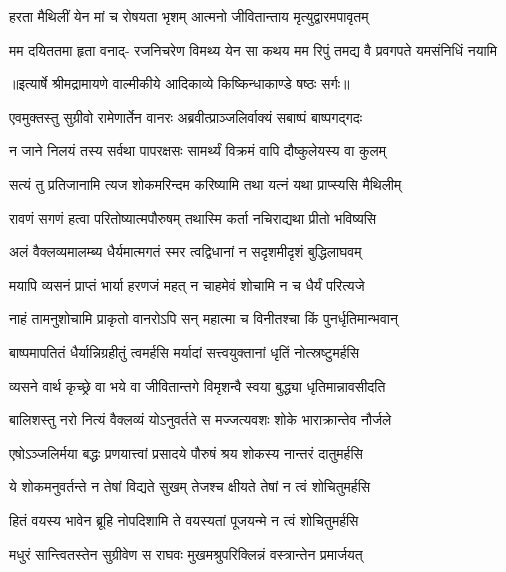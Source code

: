 \twolineshloka
{हरता मैथिलीं येन मां च रोषयता भृशम्}
{आत्मनो जीवितान्ताय मृत्युद्वारमपावृतम्} %

\fourlineindentedshloka
{मम दयिततमा हृता वनाद्-}
{रजनिचरेण विमथ्य येन सा}
{कथय मम रिपुं तमद्य वै}
{प्रवगपते यमसंनिधिं नयामि} %


{॥इत्यार्षे श्रीमद्रामायणे वाल्मीकीये आदिकाव्ये किष्किन्धाकाण्डे षष्ठः सर्गः॥}


\twolineshloka
{एवमुक्तस्तु सुग्रीवो रामेणार्तेन वानरः}
{अब्रवीत्प्राञ्जलिर्वाक्यं सबाष्पं बाष्पगद्गदः} %

\twolineshloka
{न जाने निलयं तस्य सर्वथा पापरक्षसः}
{सामर्थ्यं विक्रमं वापि दौष्कुलेयस्य वा कुलम्} %

\twolineshloka
{सत्यं तु प्रतिजानामि त्यज शोकमरिन्दम}
{करिष्यामि तथा यत्नं यथा प्राप्स्यसि मैथिलीम्} %

\twolineshloka
{रावणं सगणं हत्वा परितोष्यात्मपौरुषम्}
{तथास्मि कर्ता नचिराद्यथा प्रीतो भविष्यसि} %

\twolineshloka
{अलं वैक्लव्यमालम्ब्य धैर्यमात्मगतं स्मर}
{त्वद्विधानां न सदृशमीदृशं बुद्धिलाघवम्} %

\twolineshloka
{मयापि व्यसनं प्राप्तं भार्या हरणजं महत्}
{न चाहमेवं शोचामि न च धैर्यं परित्यजे} %

\twolineshloka
{नाहं तामनुशोचामि प्राकृतो वानरोऽपि सन्}
{महात्मा च विनीतश्चा किं पुनर्धृतिमान्भवान्} %

\twolineshloka
{बाष्पमापतितं धैर्यान्निग्रहीतुं त्वमर्हसि}
{मर्यादां सत्त्वयुक्तानां धृतिं नोत्स्रष्टुमर्हसि} %

\twolineshloka
{व्यसने वार्थ कृच्छ्रे वा भये वा जीवितान्तगे}
{विमृशन्वै स्वया बुद्ध्या धृतिमान्नावसीदति} %

\twolineshloka
{बालिशस्तु नरो नित्यं वैक्लव्यं योऽनुवर्तते}
{स मज्जत्यवशः शोके भाराक्रान्तेव नौर्जले} %

\twolineshloka
{एषोऽञ्जलिर्मया बद्धः प्रणयात्त्वां प्रसादये}
{पौरुषं श्रय शोकस्य नान्तरं दातुमर्हसि} %

\twolineshloka
{ये शोकमनुवर्तन्ते न तेषां विद्यते सुखम्}
{तेजश्च क्षीयते तेषां न त्वं शोचितुमर्हसि} %

\twolineshloka
{हितं वयस्य भावेन ब्रूहि नोपदिशामि ते}
{वयस्यतां पूजयन्मे न त्वं शोचितुमर्हसि} %

\twolineshloka
{मधुरं सान्त्वितस्तेन सुग्रीवेण स राघवः}
{मुखमश्रुपरिक्लिन्नं वस्त्रान्तेन प्रमार्जयत्} %

